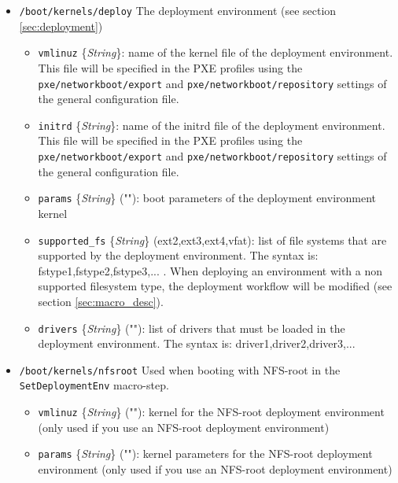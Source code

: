 \documentclass[a4wide,10pt,oneside]{book}
\newcommand{\ypath}[1]{\texttt{#1}}
\newcommand{\yfield}[2]{\texttt{#1} {\small\{{\emph{#2}}\}}:}
\newcommand{\yfieldd}[3]{\texttt{#1} {\small\{{\emph{#2}}\}} {\small(}#3{\small)}:}
\begin{document}
\begin{itemize}
  \item \ypath{/boot/kernels/deploy} The deployment environment (see section \ref{sec:deployment})
  \begin{itemize}
    \item \yfield{vmlinuz}{String} name of the kernel file of the deployment environment. This file will be specified in the PXE profiles using the \ypath{pxe/networkboot/export} and \ypath{pxe/networkboot/repository} settings of the general configuration file.
    \item \yfield{initrd}{String} name of the initrd file of the deployment environment. This file will be specified in the PXE profiles using the \ypath{pxe/networkboot/export} and \ypath{pxe/networkboot/repository} settings of the general configuration file.
    \item \yfieldd{params}{String}{""} boot parameters of the deployment environment kernel
    \item \yfieldd{supported\_fs}{String}{ext2,ext3,ext4,vfat} list of file systems that are supported by the deployment environment. The syntax is: fstype1,fstype2,fstype3,... . When deploying an environment with a non supported filesystem type, the deployment workflow will be modified (see section \ref{sec:macro_desc}).
    \item \yfieldd{drivers}{String}{""} list of drivers that must be loaded in the deployment environment. The syntax is: driver1,driver2,driver3,...
  \end{itemize}

  \item \ypath{/boot/kernels/nfsroot} Used when booting with NFS-root in the \texttt{SetDeploymentEnv} macro-step.
  \begin{itemize}
    \item \yfieldd{vmlinuz}{String}{""} kernel for the NFS-root deployment environment (only used if you use an NFS-root deployment environment)
    \item \yfieldd{params}{String}{""} kernel parameters for the NFS-root deployment environment (only used if you use an NFS-root deployment environment)
  \end{itemize}



\end{itemize}
\end{document}
